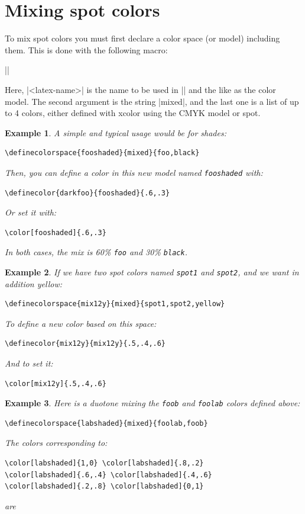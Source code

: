 \documentclass[a4paper]{ltxguide}
\def\showclr#1#{\testclr{#1}}
\def\testclr#1#2{{\fboxsep0pt\fbox{\colorbox#1{#2}{\phantom{,MM}}}}}
\newtheorem{example}{Example}
\begin{document}
\section{Mixing spot colors}

To mix spot colors you must first declare a color space (or model)
including them. This is done with the following macro:

\begin{decl}
  ||
\end{decl}

Here, |<latex-name>| is the name to be used in |\color| and the
like as the color model. The second argument is the string |mixed|,
and the last one is a list of up to 4 colors, either defined with
\textsf{xcolor} using the CMYK model or spot.

\begin{example}
  A simple and typical usage would be for shades:
\begin{verbatim}
\definecolorspace{fooshaded}{mixed}{foo,black}
\end{verbatim}
  Then, you can define a color in this new model named
  \verb|fooshaded| with:
\begin{verbatim}
\definecolor{darkfoo}{fooshaded}{.6,.3}
\end{verbatim}
Or set it with:
\begin{verbatim}
\color[fooshaded]{.6,.3}
\end{verbatim}
In both cases, the mix is 60\% \verb|foo| and 30\% \verb|black|.
\end{example}

\begin{example}
  If we have two spot colors named \verb|spot1| and \verb|spot2|, and
  we want in addition yellow:
\begin{verbatim}
\definecolorspace{mix12y}{mixed}{spot1,spot2,yellow}
\end{verbatim}
To define a new color based on this space:
\begin{verbatim}
\definecolor{mix12y}{mix12y}{.5,.4,.6}
\end{verbatim}
And to set it:
\begin{verbatim}
\color[mix12y]{.5,.4,.6}
\end{verbatim}
\end{example}

\begin{example}
Here is a duotone mixing the \verb|foob| and \verb|foolab| colors defined above:
\begin{verbatim}
\definecolorspace{labshaded}{mixed}{foolab,foob}
\end{verbatim}
The colors corresponding to:
\begin{verbatim}
\color[labshaded]{1,0} \color[labshaded]{.8,.2}
\color[labshaded]{.6,.4} \color[labshaded]{.4,.6}
\color[labshaded]{.2,.8} \color[labshaded]{0,1}
\end{verbatim}
are  
   
   
\end{example}
\end{document}
